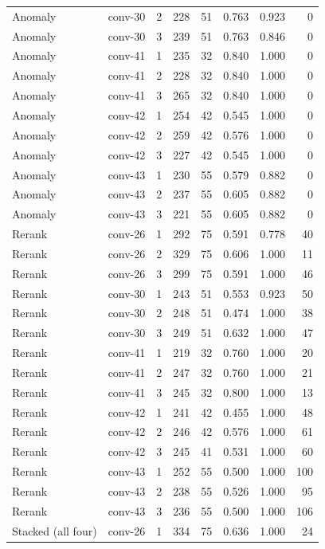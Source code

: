 \begin{longtable}{llrrrrrr}
Anomaly & conv-30 & 2 & 228 & 51 & 0.763 & 0.923 & 0 \\
Anomaly & conv-30 & 3 & 239 & 51 & 0.763 & 0.846 & 0 \\
Anomaly & conv-41 & 1 & 235 & 32 & 0.840 & 1.000 & 0 \\
Anomaly & conv-41 & 2 & 228 & 32 & 0.840 & 1.000 & 0 \\
Anomaly & conv-41 & 3 & 265 & 32 & 0.840 & 1.000 & 0 \\
Anomaly & conv-42 & 1 & 254 & 42 & 0.545 & 1.000 & 0 \\
Anomaly & conv-42 & 2 & 259 & 42 & 0.576 & 1.000 & 0 \\
Anomaly & conv-42 & 3 & 227 & 42 & 0.545 & 1.000 & 0 \\
Anomaly & conv-43 & 1 & 230 & 55 & 0.579 & 0.882 & 0 \\
Anomaly & conv-43 & 2 & 237 & 55 & 0.605 & 0.882 & 0 \\
Anomaly & conv-43 & 3 & 221 & 55 & 0.605 & 0.882 & 0 \\
Rerank & conv-26 & 1 & 292 & 75 & 0.591 & 0.778 & 40 \\
Rerank & conv-26 & 2 & 329 & 75 & 0.606 & 1.000 & 11 \\
Rerank & conv-26 & 3 & 299 & 75 & 0.591 & 1.000 & 46 \\
Rerank & conv-30 & 1 & 243 & 51 & 0.553 & 0.923 & 50 \\
Rerank & conv-30 & 2 & 248 & 51 & 0.474 & 1.000 & 38 \\
Rerank & conv-30 & 3 & 249 & 51 & 0.632 & 1.000 & 47 \\
Rerank & conv-41 & 1 & 219 & 32 & 0.760 & 1.000 & 20 \\
Rerank & conv-41 & 2 & 247 & 32 & 0.760 & 1.000 & 21 \\
Rerank & conv-41 & 3 & 245 & 32 & 0.800 & 1.000 & 13 \\
Rerank & conv-42 & 1 & 241 & 42 & 0.455 & 1.000 & 48 \\
Rerank & conv-42 & 2 & 246 & 42 & 0.576 & 1.000 & 61 \\
Rerank & conv-42 & 3 & 245 & 41 & 0.531 & 1.000 & 60 \\
Rerank & conv-43 & 1 & 252 & 55 & 0.500 & 1.000 & 100 \\
Rerank & conv-43 & 2 & 238 & 55 & 0.526 & 1.000 & 95 \\
Rerank & conv-43 & 3 & 236 & 55 & 0.500 & 1.000 & 106 \\
Stacked (all four) & conv-26 & 1 & 334 & 75 & 0.636 & 1.000 & 24 \\

\end{longtable}
